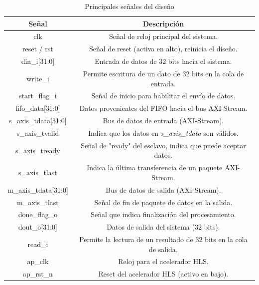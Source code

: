 \begin{table}[H]
    \centering
    \resizebox{10cm}{!} {
        \begin{tabular}{|c|c|}
            \hline
            \textbf{Señal} & \textbf{Descripción} \\
            \hline
            clk & Señal de reloj principal del sistema. \\
            \hline
            reset / rst & Señal de reset (activa en alto), reinicia el diseño. \\
            \hline
            din\_i[31:0] & Entrada de datos de 32 bits hacia el sistema. \\
            \hline
            write\_i & Permite escritura de un dato de 32 bits en la cola de entrada. \\
            \hline
            start\_flag\_i & Señal de inicio para habilitar el envío de datos. \\
            \hline
            fifo\_data[31:0] & Datos provenientes del FIFO hacia el bus AXI-Stream. \\
            \hline
            s\_axis\_tdata[31:0] & Bus de datos de entrada (AXI-Stream). \\
            \hline
            s\_axis\_tvalid & Indica que los datos en \emph{s\_axis\_tdata} son válidos. \\
            \hline
            s\_axis\_tready & Señal de "ready" del esclavo, indica que puede aceptar datos. \\
            \hline
            s\_axis\_tlast & Indica la última transferencia de un paquete AXI-Stream. \\
            \hline
            m\_axis\_tdata[31:0] & Bus de datos de salida (AXI-Stream). \\
            \hline
            m\_axis\_tlast & Señal de fin de paquete de datos en la salida. \\
            \hline
            done\_flag\_o & Señal que indica finalización del procesamiento. \\
            \hline
            dout\_o[31:0] & Datos de salida del sistema (32 bits). \\
            \hline
            read\_i & Permite la lectura de un resultado de 32 bits en la cola de salida. \\
            \hline
            ap\_clk & Reloj para el acelerador HLS. \\
            \hline
            ap\_rst\_n & Reset del acelerador HLS (activo en bajo). \\
            \hline
        \end{tabular}
    }
    \caption{Principales señales del diseño}
    \label{tbl:senalesDiseno}
\end{table}

